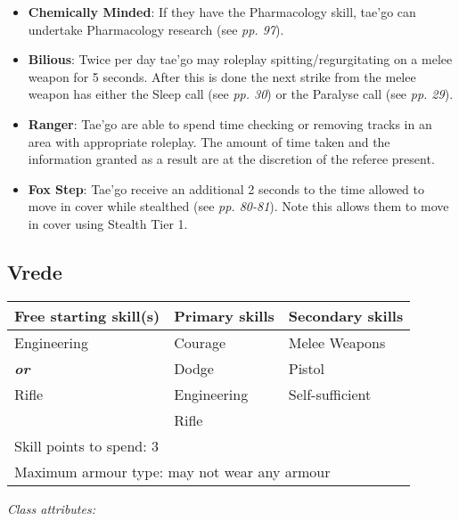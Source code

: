 \documentclass{scrbook}
\begin{document}
\begin{itemize}
\item \textbf{Chemically Minded}: If they have the Pharmacology skill, tae'go can undertake Pharmacology research (see \textit{pp. 97}).

\item \textbf{Bilious}: Twice per day tae'go may roleplay spitting/regurgitating on a melee weapon for 5 seconds. After this is done the next strike from the melee weapon has either the Sleep call (see \textit{pp. 30}) or the Paralyse call (see \textit{pp. 29}).

\item \textbf{Ranger}: Tae'go are able to spend time checking or removing tracks in an area with appropriate roleplay. The amount of time taken and the information granted as a result are at the discretion of the referee present.

\item \textbf{Fox Step}: Tae'go receive an additional 2 seconds to the time allowed to move in cover while stealthed (see \textit{pp. 80-81}). Note this allows them to move in cover using Stealth Tier 1.

\end{itemize}
\subsection{Vrede}

\begin{table}
\begin{tabular}{|l|l|l|} \hline 
Free starting skill(s) & Primary skills & Secondary skills \\
 \hline Engineering & Courage & Melee Weapons \\
 \hline \textbf{\textit{or}} & Dodge & Pistol \\
 \hline Rifle & Engineering & Self-sufficient \\
 \hline  & Rifle &  \\
 \hline \multicolumn{3}{|l|}{Skill points to spend: 3} \\
 \hline \multicolumn{3}{|l|}{Maximum armour type: may not wear any armour} \\
 \hline \end{tabular}

\end{table}

\textit{Class attributes:}
\end{document}
